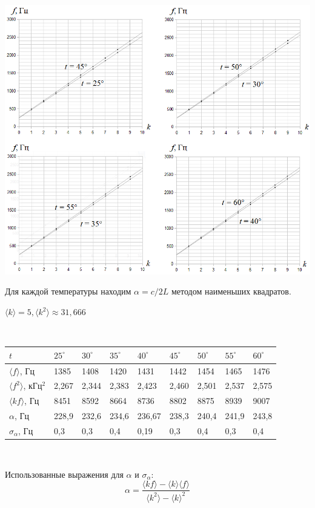 \documentclass[12pt]{article}
\begin{document}
\begin{center}\includegraphics[width=1\textwidth]{2132.png}\end{center}
\newpage
Для каждой температуры находим $\alpha = c/2L$ методом наименьших квадратов.

$\langle k \rangle = 5, \langle k^2 \rangle \approx 31,666$

~

\noindent\begin{tabular}{ |l|l|l|l|l|l|l|l|l| }
  \hline
  $t$ & $25^\circ$ & $30^\circ$ & $35^\circ$ & $40^\circ$ & $45^\circ$ & $50^\circ$ & $55^\circ$ & $60^\circ$ \\
\hline
$\langle f \rangle$, Гц & 1385 & 1408 & 1420 & 1431 & 1442 & 1454 & 1465 & 1476\\
$\langle f^2 \rangle$, кГц$^2$ & 2,267 & 2,344 & 2,383 & 2,423 & 2,460 & 2,501 & 2,537 & 2,575\\
$\langle kf \rangle$, Гц & 8451 & 8592 & 8664 & 8736 & 8802 & 8875 & 8939 & 9007\\
$\alpha$, Гц & 228,9 & 232,6 & 234,6 & 236,67 & 238,3 & 240,4 & 241,9 & 243,8\\
$\sigma_\alpha$, Гц & 0,3 & 0,3 & 0,4 & 0,19 & 0,3 & 0,4 & 0,3 & 0,4\\
\hline
\end{tabular}

~

Использованные выражения для $\alpha$ и $\sigma_\alpha$:
$$\alpha = \frac{\langle kf \rangle - \langle k \rangle \langle f \rangle}{\langle k^2 \rangle - \langle k \rangle ^2}$$
\end{document}
